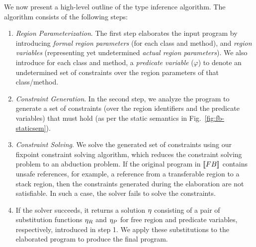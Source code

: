 We now present a high-level outline of the type inference algorithm.
The algorithm consists of the following steps:
\begin{enumerate}
 \item \emph{Region Parameterization}.
   The first step elaborates the input program by introducing \emph{formal region parameters}
   (for each class and method), and \emph{region variables} (representing yet undetermined
   \emph{actual region parameters}). We also introduce for each class and method, a
   \emph{predicate variable} ($\varphi$) to denote an undetermined set of constraints
   over the region parameters of that class/method.

 \item \emph{Constraint Generation}.
   In the second step, we analyze the program to generate a set of constraints
   (over the region identifiers and the predicate variables)
   that must hold (as per the static semantics in Fig.~\ref{fig:fb-staticsem}).

 \item \emph{Constraint Solving}.
   We solve the generated set of constraints using our fixpoint constraint
   solving algorithm, which reduces the constraint solving problem to
   an abduction problem. If the original program in $\llbracket {\sc FB} \rrbracket$ contains unsafe
   references, for example, a reference from a transferable region to a
   stack region, then the constraints generated during the elaboration
   are not satisfiable. In such a case, the solver fails to solve
   the constraints.

 \item If the solver succeeds, it returns a solution $\eta$ consisting of a
   pair of substitution functions $\eta_R$ and $\eta_P$ for
   free region and predicate variables, respectively, introduced in step 1.
   We apply these substitutions to the elaborated program to produce the final program.
\end{enumerate}

% 

